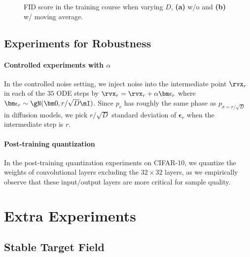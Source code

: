 \begin{figure*}
\centering
        \caption{FID score in the training course when varying $D$, \textbf{(a)} w/o and \textbf{(b)} w/ moving average.}
\end{figure*}


\subsection{Experiments for Robustness}
\label{app:robust-exp}

\paragraph{Controlled experiments with $\alpha$} In the controlled noise setting, we inject noise into the intermediate point $\rvx_r$ in each of the $35$ ODE steps by $\rvx_r=\rvx_r + \alpha\bm\epsilon_r$ where $\bm\epsilon_r\sim \gN(\bm 0, r/\sqrt{D}\mI)$. Since $p_r$ has roughly the same phase as $p_{\sigma=r/\sqrt{D}}$ in diffusion models, we pick $r/\sqrt{D}$ standard deviation of $\bm \epsilon_r$ when the intermediate step is $r$.

\paragraph{Post-training quantization} In the post-training quantization experiments on CIFAR-10, we quantize the weights of convolutional layers excluding the $32\times 32$ layers, as we empirically observe that these input/output layers are more critical for sample quality.
\section{Extra Experiments}

\subsection{Stable Target Field}
\label{app:stf}


